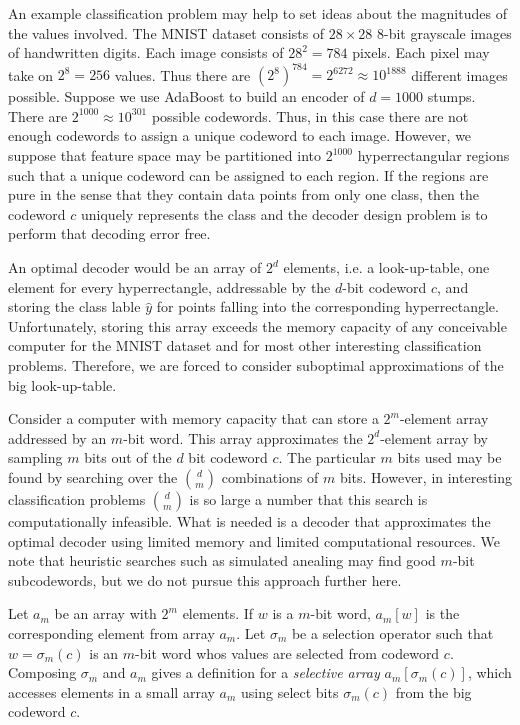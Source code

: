 \documentclass{article}
\begin{document}
An example classification problem may help to set ideas about the magnitudes of the values involved.  The MNIST dataset consists of $28 \times 28$ 8-bit grayscale images of handwritten digits.  Each image consists of $28^2=784$ pixels.  Each pixel may take on $2^8=256$ values.  Thus there are $(2^8)^{784} = 2^{6272} \approx 10^{1888}$ different images possible.  Suppose we use AdaBoost to build an encoder of $d=1000$ stumps.  There are $2^{1000} \approx 10^{301}$ possible codewords.  Thus, in this case there are not enough codewords to assign a unique codeword to each image.  However, we suppose that feature space may be partitioned into $2^{1000}$ hyperrectangular regions such that a unique codeword can be assigned to each region.  If the regions are pure in the sense that they contain data points from only one class, then the codeword $c$ uniquely represents the class and the decoder design problem is to perform that decoding error free.

An optimal decoder would be an array of $2^d$ elements, i.e. a look-up-table, one element for every hyperrectangle, addressable by the $d$-bit codeword $c$, and storing the class lable $\hat{y}$ for points falling into the corresponding hyperrectangle.  Unfortunately, storing this array exceeds the memory capacity of any conceivable computer for the MNIST dataset and for most other interesting classification problems.  Therefore, we are forced to consider suboptimal approximations of the big look-up-table.

Consider a computer with memory capacity that can store a $2^m$-element array addressed by an $m$-bit word.  This array approximates the $2^d$-element array by sampling $m$ bits out of the $d$ bit codeword $c$.  The particular $m$ bits used may be found by searching over the ${d \choose m}$ combinations of $m$ bits.  However, in interesting classification problems ${d \choose m}$ is so large a number that this search is computationally infeasible.  What is needed is a decoder that approximates the optimal decoder using limited memory and limited computational resources.  We note that heuristic searches such as simulated anealing may find good $m$-bit subcodewords, but we do not pursue this approach further here.

Let $a_{m}$ be an array with $2^m$ elements.  If $w$ is a $m$-bit word, $a_m[w]$ is the corresponding element from array $a_m$.  Let $\sigma_m$ be a selection operator such that $w=\sigma_m(c)$ is an $m$-bit word whos values are selected from codeword $c$.  Composing $\sigma_m$ and $a_m$ gives a definition for a {\it selective array} $a_m[\sigma_m(c)]$, which accesses elements in a small array $a_m$ using select bits $\sigma_m(c)$ from the big codeword $c$.
\end{document}
